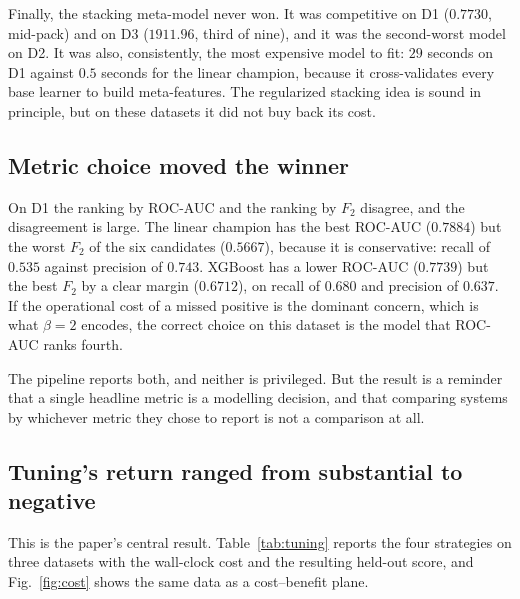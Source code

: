 \documentclass{ieeeaccess}
\begin{document}
Finally, the stacking meta-model never won. It was competitive on D1 ($0.7730$, mid-pack) and on D3 ($1911.96$, third of nine), and it was the second-worst model on D2. It was also, consistently, the most expensive model to fit: $29$ seconds on D1 against $0.5$ seconds for the linear champion, because it cross-validates every base learner to build meta-features. The regularized stacking idea \cite{regstack2025} is sound in principle, but on these datasets it did not buy back its cost.

\subsection{Metric choice moved the winner}
On D1 the ranking by ROC-AUC and the ranking by $F_2$ disagree, and the disagreement is large. The linear champion has the best ROC-AUC ($0.7884$) but the worst $F_2$ of the six candidates ($0.5667$), because it is conservative: recall of $0.535$ against precision of $0.743$. XGBoost has a lower ROC-AUC ($0.7739$) but the best $F_2$ by a clear margin ($0.6712$), on recall of $0.680$ and precision of $0.637$. If the operational cost of a missed positive is the dominant concern, which is what $\beta = 2$ encodes, the correct choice on this dataset is the model that ROC-AUC ranks fourth.

The pipeline reports both, and neither is privileged. But the result is a reminder that a single headline metric is a modelling decision, and that comparing systems by whichever metric they chose to report is not a comparison at all.

\subsection{Tuning's return ranged from substantial to negative}
This is the paper's central result. Table~\ref{tab:tuning} reports the four strategies on three datasets with the wall-clock cost and the resulting held-out score, and Fig.~\ref{fig:cost} shows the same data as a cost--benefit plane.
\end{document}
